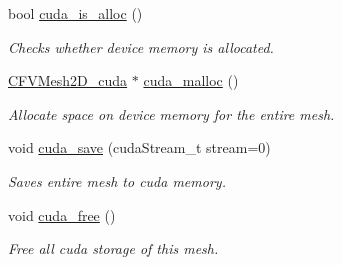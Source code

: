 \begin{DoxyCompactItemize}
bool \hyperlink{classFVL_1_1CFVMesh2D_af451f67501054350bf2009f98ed5fe11}{cuda\_\-is\_\-alloc} ()
\begin{DoxyCompactList}\small\item\em Checks whether device memory is allocated. \item\end{DoxyCompactList}\item 
\hyperlink{structFVL_1_1CFVMesh2D__cuda}{CFVMesh2D\_\-cuda} $\ast$ \hyperlink{classFVL_1_1CFVMesh2D_aa84c3c881bec148d68a3e847feb4ecd5}{cuda\_\-malloc} ()
\begin{DoxyCompactList}\small\item\em Allocate space on device memory for the entire mesh. \item\end{DoxyCompactList}\item 
void \hyperlink{classFVL_1_1CFVMesh2D_a817cca487c7f644b7e5d1abf8bd42308}{cuda\_\-save} (cudaStream\_\-t stream=0)
\begin{DoxyCompactList}\small\item\em Saves entire mesh to cuda memory. \item\end{DoxyCompactList}\item 
void \hyperlink{classFVL_1_1CFVMesh2D_a7da37a3af0dbb3b115a980bf13d30d02}{cuda\_\-free} ()
\begin{DoxyCompactList}\small\item\em Free all cuda storage of this mesh. \item\end{DoxyCompactList}\end{DoxyCompactItemize}
